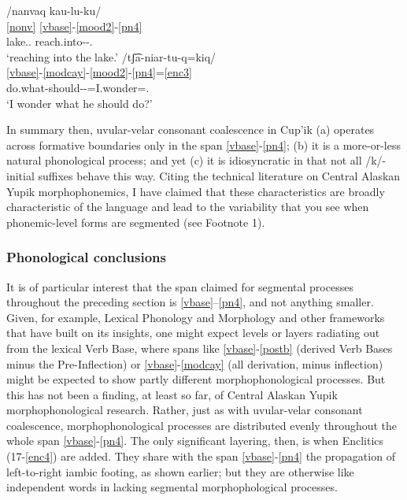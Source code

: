 \documentclass[output=paper]{langscibook}
\begin{document}
\ea\label{ex:key:47}
\ea\label{ex:key:47a}\glll /nanvaq kau-lu-ku/\\
    \ref{nonv} \ref{vbase}-\ref{mood2}-\ref{pn4}\\
     lake.\Abs.\Sg{} reach.into-\Appos-\Tsg.\Obj{}\\
\glt {}`reaching into the lake.'
\ex\label{ex:key:47b}
\glll /tʃ͡a-niar-tu-q=kiq/\\
    \ref{vbase}-\ref{modcay}-\ref{mood2}-\ref{pn4}=\ref{enc3} \\
     do.what-should-\Ind{}-\Third\Sarg{}=I.wonder=\Refl.\\
\glt {}`I wonder what he should do?'
\z
\z

In summary then, uvular-velar consonant coalescence in Cup'ik (a) operates across formative boundaries only in the span \ref{vbase}-\ref{pn4}; (b) it is a more-or-less natural phonological process; and yet (c) it is idiosyncratic in that not all /k/-initial suffixes behave this way. Citing the technical literature on Central Alaskan Yupik morphophonemics, I have claimed that these characteristics are broadly characteristic of the language and lead to the variability that you see when phonemic-level forms are segmented (see Footnote 1).


\subsubsection{Phonological conclusions} 
\label{sec:5.7.5}

It is of particular interest that the span claimed for segmental processes throughout the preceding section is \ref{vbase}--\ref{pn4}, and not anything smaller. Given, for example, Lexical Phonology and Morphology \citep{Kiparsky1985} and other frameworks that have built on its insights, one might expect levels or layers radiating out from the lexical Verb Base, where spans like \ref{vbase}-\ref{postb} (derived Verb Bases minus the Pre-Inflection) or \ref{vbase}-\ref{modcay} (all derivation, minus inflection) might be expected to show partly different morphophonological processes. But this has not been a finding, at least so far, of Central Alaskan Yupik morphophonological research. Rather, just as with uvular-velar consonant coalescence, morphophonological processes are distributed evenly throughout the whole span \ref{vbase}-\ref{pn4}. The only significant layering, then, is when Enclitics (17-\ref{enc4}) are added. They share with the span \ref{vbase}-\ref{pn4} the propagation of left-to-right iambic footing, as shown earlier; but they are otherwise like independent words in lacking segmental morphophological processes.
\end{document}
